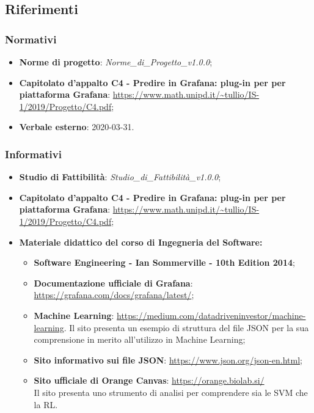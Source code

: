 \subsection{Riferimenti}
		\subsubsection{Normativi}
			\begin{itemize}
				\item \textbf{Norme di progetto}: \emph{Norme\_di\_Progetto\_v1.0.0};
				\item \textbf{Capitolato d'appalto C4 - Predire in Grafana: plug-in per per piattaforma Grafana}: \url{https://www.math.unipd.it/~tullio/IS-1/2019/Progetto/C4.pdf};
				\item \textbf{Verbale esterno}: 2020-03-31. 
			\end{itemize}
		
		\subsubsection{Informativi}
			\begin{itemize}
				\item \textbf{Studio di Fattibilità}: \emph{Studio\_di\_Fattibilità\_v1.0.0};
				\item \textbf{Capitolato d'appalto C4 - Predire in Grafana: plug-in per per piattaforma Grafana}: \url{https://www.math.unipd.it/~tullio/IS-1/2019/Progetto/C4.pdf};
				\item \textbf{Materiale didattico del corso di Ingegneria del Software:}
				\begin{itemize}
					\item \textbf{Software Engineering - Ian Sommerville - 10th Edition 2014};
					\item \textbf{Documentazione ufficiale di Grafana}: \url{https://grafana.com/docs/grafana/latest/};
					\item \textbf{Machine Learning}: \href{https://medium.com/datadriveninvestor/machine-learning-how-to-save-and-load-scikit-learn-models-d7b99bc32c27}{https://medium.com/datadriveninvestor/machine-learning}. Il sito presenta un esempio di struttura del file JSON per la sua comprensione in merito all'utilizzo in Machine Learning;
					\item \textbf{Sito informativo sui file JSON}: \url{https://www.json.org/json-en.html};
					\item \textbf{Sito ufficiale di Orange Canvas}: \url{https://orange.biolab.si/} \\ Il sito presenta uno strumento di analisi per comprendere sia le SVM che la RL. 
				\end{itemize}
			\end{itemize}				